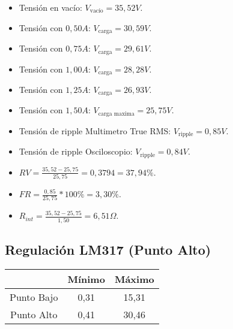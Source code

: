     \begin{itemize}
        \item Tensión en vacío: $V_{\text{vacío}} = 35,52 V$.
        \item Tensión con $0,50 A$: $V_{\text{carga}} = 30,59 V$.
        \item Tensión con $0,75 A$: $V_{\text{carga}} = 29,61 V$.
        \item Tensión con $1,00 A$: $V_{\text{carga}} = 28,28 V$.
        \item Tensión con $1,25 A$: $V_{\text{carga}} = 26,93 V$.
        \item Tensión con $1,50 A$: $V_{\text{carga maxima}} = 25,75 V$.
        \item Tensión de ripple Multimetro True RMS: $V_{\text{ripple}} = 0,85 V$.
        \item Tensión de ripple Osciloscopio: $V_{\text{ripple}} = 0,84 V$.
    \end{itemize}

    \begin{itemize}
        \item $RV = \frac{35,52 - 25,75}{25,75} = 0,3794 = 37,94\%$.
        \item $FR = \frac{0,85}{25,75} * 100\% = 3,30\%$.
        \item $R_{int} = \frac{35,52 - 25,75}{1,50} = 6,51 \Omega$.
    \end{itemize}

    \subsection{Regulación LM317 (Punto Alto)}


 \begin{center}
    \begin{tabular}{ c|c|c }
        & Mínimo & Máximo \\
        \midrule
        Punto Bajo & 0,31 & 15,31 \\
        Punto Alto & 0,41 & 30,46 \\
    \end{tabular}
\end{center}


